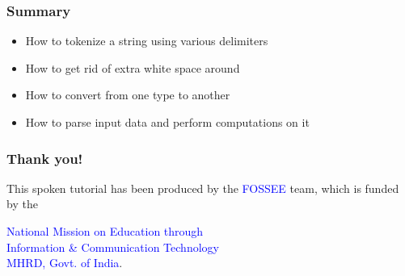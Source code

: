 \documentclass[presentation]{beamer}
\begin{document}
\begin{frame}
\frametitle{Summary}
\label{sec-8}

\begin{itemize}
\item How to tokenize a string using various delimiters
\item How to get rid of extra white space around
\item How to convert from one type to another
\item How to parse input data and perform computations on it
\end{itemize}
\end{frame}
\begin{frame}
\frametitle{Thank you!}
\label{sec-9}

  \begin{block}{}
  \begin{center}
  This spoken tutorial has been produced by the
  \textcolor{blue}{FOSSEE} team, which is funded by the 
  \end{center}
  \begin{center}
    \textcolor{blue}{National Mission on Education through \\
      Information \& Communication Technology \\ 
      MHRD, Govt. of India}.
  \end{center}  
  \end{block}
\end{frame}
\end{document}
